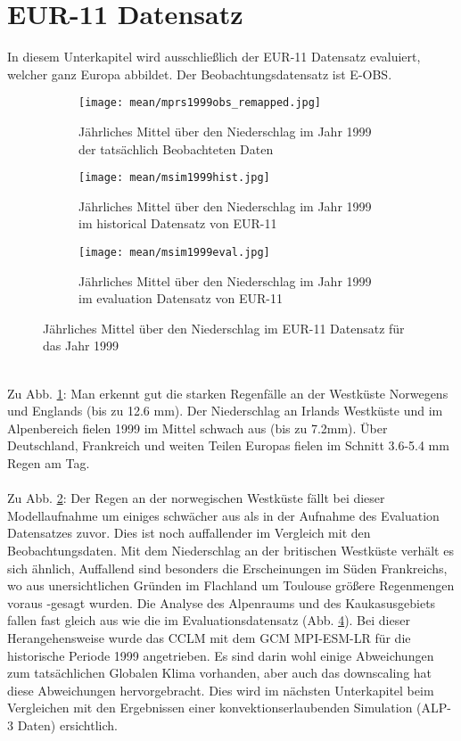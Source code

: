 \section{EUR-11 Datensatz}
In diesem Unterkapitel wird ausschließlich der EUR-11 Datensatz evaluiert, welcher ganz Europa abbildet. Der Beobachtungsdatensatz ist E-OBS\cite{eobs}.\\
\begin{figure}[hbt!]
	\begin{subfigure}{0.49\textwidth}
		\texttt{[image: mean/mprs1999obs\_remapped.jpg]}
		\caption{Jährliches Mittel über den Niederschlag im Jahr 1999 der tatsächlich Beobachteten Daten}
		\label{fig:mobs99}
	\end{subfigure}
	\begin{subfigure}{0.49\textwidth}
		\texttt{[image: mean/msim1999hist.jpg]}
		\caption{Jährliches Mittel über den Niederschlag im Jahr 1999 im historical Datensatz von EUR-11}
		\label{fig:mhist99}
	\end{subfigure}
	\begin{subfigure}{\textwidth}
		\centering
		\texttt{[image: mean/msim1999eval.jpg]}
		\caption{Jährliches Mittel über den Niederschlag im Jahr 1999 im evaluation Datensatz von EUR-11}
		\label{fig:meval99}
	\end{subfigure}
	\caption{Jährliches Mittel über den Niederschlag im EUR-11 Datensatz für das Jahr 1999}
\end{figure}
\\
Zu Abb. \ref{fig:mobs99}: Man erkennt gut die starken Regenfälle an der Westküste Norwegens und Englands (bis zu 12.6 mm). Der Niederschlag an Irlands Westküste und im Alpenbereich fielen 1999 im Mittel schwach aus (bis zu 7.2mm). Über Deutschland, Frankreich und weiten Teilen Europas fielen im Schnitt 3.6-5.4 mm Regen am Tag.\\
\\
Zu Abb. \ref{fig:mhist99}: Der Regen an der norwegischen Westküste fällt bei dieser Modellaufnahme um einiges schwächer aus als in der Aufnahme des Evaluation Datensatzes zuvor. Dies ist noch auffallender im Vergleich mit den Beobachtungsdaten. Mit dem Niederschlag an der britischen Westküste verhält es sich ähnlich, Auffallend sind besonders die Erscheinungen im Süden Frankreichs, wo aus unersichtlichen Gründen im Flachland um Toulouse größere Regenmengen \glqq voraus \grqq-gesagt wurden. Die Analyse des Alpenraums und des Kaukasusgebiets fallen fast gleich aus wie die im Evaluationsdatensatz (Abb. \ref{fig:meval99}). Bei dieser Herangehensweise wurde das CCLM mit dem GCM MPI-ESM-LR für die historische Periode 1999 angetrieben. Es sind darin wohl einige Abweichungen zum tatsächlichen Globalen Klima vorhanden, aber auch das downscaling hat diese Abweichungen hervorgebracht. Dies wird im nächsten Unterkapitel beim Vergleichen mit den Ergebnissen einer konvektionserlaubenden Simulation (ALP-3 Daten) ersichtlich.\\
